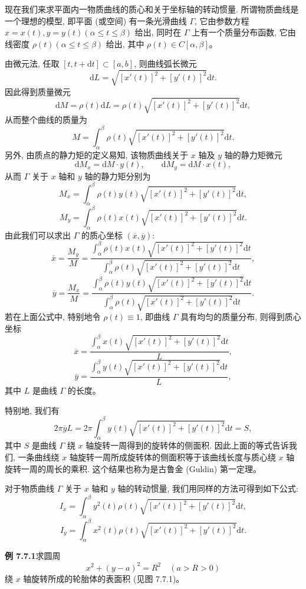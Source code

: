 \documentclass[UTF8, 12pt, fontset=fandol, oneside]{ctexart}
\begin{document}
现在我们来求平面内一物质曲线的质心和关于坐标轴的转动惯量. 所谓物质曲线是一个理想的模型, 即平面 (或空间) 有一条光滑曲线 $\Gamma$, 它由参数方程 $x=x(t),y=y(t)(\alpha\leq t\leq\beta)$ 给出, 同时在 $\Gamma$ 上有一个质量分布函数, 它由线密度 $\rho(t)(\alpha\leq t\leq\beta)$ 给出, 其中 $\rho(t)\in C[\alpha,\beta]$。

由微元法, 任取 $[t,t+\mathrm dt]\subset[a,b]$, 则曲线弧长微元
\[
  \mathrm dL=\sqrt{[x'(t)]^2+[y'(t)]^2}\mathrm dt.
\]
因此得到质量微元
\[
  \mathrm dM=\rho(t)\mathrm dL=\rho(t)\sqrt{[x'(t)]^2+[y'(t)]^2}\mathrm dt,
\]
从而整个曲线的质量为
\[
  M=\int_\alpha^\beta \rho(t)\sqrt{[x'(t)]^2+[y'(t)]^2}\mathrm dt.
\]
另外, 由质点的静力矩的定义易知, 该物质曲线关于 $x$ 轴及 $y$ 轴的静力矩微元
\[
  \mathrm dM_x=\mathrm dM\cdot y(t),\qquad
  \mathrm dM_y=\mathrm dM\cdot x(t),
\]
从而 $\Gamma$ 关于 $x$ 轴和 $y$ 轴的静力矩分别为
\[
  M_x=\int_\alpha^\beta \rho(t)y(t)\sqrt{[x'(t)]^2+[y'(t)]^2}\mathrm dt,
\]
\[
  M_y=\int_\alpha^\beta \rho(t)x(t)\sqrt{[x'(t)]^2+[y'(t)]^2}\mathrm dt.
\]
由此我们可以求出 $\Gamma$ 的质心坐标 $(\overline x,\overline y)$:
\[
  \overline x=\frac{M_y}{M}
  =\frac{\int_\alpha^\beta \rho(t)x(t)\sqrt{[x'(t)]^2+[y'(t)]^2}\mathrm dt}
  {\int_\alpha^\beta \rho(t)\sqrt{[x'(t)]^2+[y'(t)]^2}\mathrm dt},
\]
\[
  \overline y=\frac{M_x}{M}
  =\frac{\int_\alpha^\beta \rho(t)y(t)\sqrt{[x'(t)]^2+[y'(t)]^2}\mathrm dt}
  {\int_\alpha^\beta \rho(t)\sqrt{[x'(t)]^2+[y'(t)]^2}\mathrm dt}.
\]
若在上面公式中, 特别地令 $\rho(t)\equiv1$, 即曲线 $\Gamma$ 具有均匀的质量分布, 则得到质心坐标
\[
  \overline x=\frac{\int_\alpha^\beta x(t)\sqrt{[x'(t)]^2+[y'(t)]^2}\mathrm dt}{L},
\]
\[
  \overline y=\frac{\int_\alpha^\beta y(t)\sqrt{[x'(t)]^2+[y'(t)]^2}\mathrm dt}{L},
\]
其中 $L$ 是曲线 $\Gamma$ 的长度。

特别地, 我们有
\[
  2\pi\overline yL
  =2\pi\int_\alpha^\beta y(t)\sqrt{[x'(t)]^2+[y'(t)]^2}\mathrm dt=S,
\]
其中 $S$ 是曲线 $\Gamma$ 绕 $x$ 轴旋转一周得到的旋转体的侧面积. 因此上面的等式告诉我们, 一条曲线绕 $x$ 轴旋转一周所成旋转体的侧面积等于该曲线长度与质心绕 $x$ 轴旋转一周的周长的乘积. 这个结果也称为是古鲁金 (Guldin) 第一定理。

对于物质曲线 $\Gamma$ 关于 $x$ 轴和 $y$ 轴的转动惯量, 我们用同样的方法可得到如下公式:
\[
  I_x=\int_\alpha^\beta y^2(t)\rho(t)\sqrt{[x'(t)]^2+[y'(t)]^2}\mathrm dt,
\]
\[
  I_y=\int_\alpha^\beta x^2(t)\rho(t)\sqrt{[x'(t)]^2+[y'(t)]^2}\mathrm dt.
\]

\noindent\textbf{例 7.7.1}\quad 求圆周
\[
  x^2+(y-a)^2=R^2\quad(a>R>0)
\]
绕 $x$ 轴旋转所成的轮胎体的表面积 (见图 7.7.1)。
\end{document}
